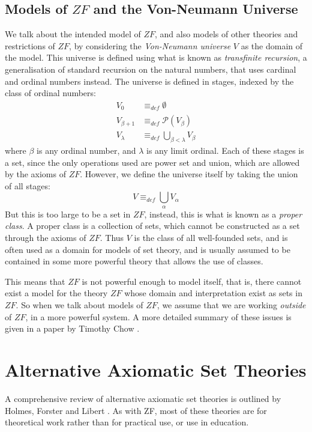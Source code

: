 \documentclass[11pt]{report}
\newcommand{\eqdef}{\equiv_\mathit{def}}
\theoremstyle{definition}
\theoremstyle{theorem}
\theoremstyle{lemma}
\begin{document}
\subsection{Models of $\mathit{ZF}$ and the Von-Neumann Universe}
We talk about the intended model of $\mathit{ZF}$, and also models of other theories and restrictions of $ZF$, by considering the \emph{Von-Neumann universe} $V$ as the domain of the model. This universe is defined using what is known as \emph{transfinite recursion}, a generalisation of standard recursion on the natural numbers, that uses cardinal and ordinal numbers instead. The universe is defined in stages, indexed by the class of ordinal numbers:
\begin{align*}
  V_0 &\eqdef \emptyset \\
  V_{\beta+1} &\eqdef \mathcal{P}(V_\beta)\\
  V_{\lambda} &\eqdef \bigcup_{\beta<\lambda} V_\beta
\end{align*}
where $\beta$ is any ordinal number, and $\lambda$ is any limit ordinal.
Each of these stages is a set, since the only operations used are power set and union, which are allowed by the axioms of $\mathit{ZF}$. However, we define the universe itself by taking the union of all stages:
$$V \eqdef \bigcup_\alpha V_\alpha$$
But this is too large to be a set in $\mathit{ZF}$, instead, this is what is known as a \emph{proper class}.
A proper class is a collection of sets, which cannot be constructed as a set through the axioms of $\mathit{ZF}$.
Thus $V$ is the class of all well-founded sets, and is often used as a domain for models of set theory, and is usually assumed to be contained in some more powerful theory that allows the use of classes.

This means that $\mathit{ZF}$ is not powerful enough to model itself, that is, there cannot exist a model for the theory $\mathit{ZF}$ whose domain and interpretation exist as sets in $\mathit{ZF}$.
So when we talk about models of $ZF$, we assume that we are working \emph{outside} of $\mathit{ZF}$, in a more powerful system. A more detailed summary of these issues is given in a paper by Timothy Chow \cite{force}.

\section{Alternative Axiomatic Set Theories}
A comprehensive review of alternative axiomatic set theories is outlined by Holmes, Forster and Libert \cite{ast}.
As with ZF, most of these theories are for theoretical work rather than for practical use, or use in education.
\end{document}
